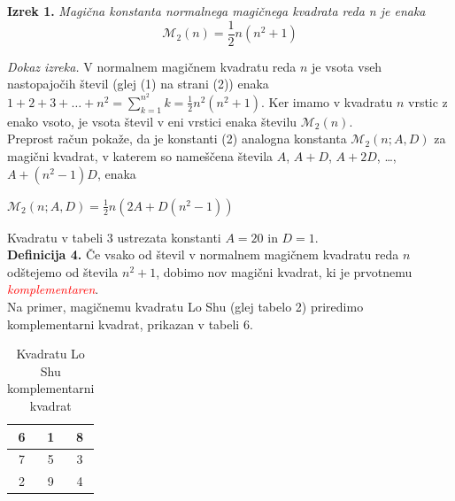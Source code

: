 \documentclass[a4paper,12pt]{article}
\begin{document}
   \textbf{Izrek 1.} \emph{Magična konstanta normalnega magičnega kvadrata reda n
   je enaka}
   \begin{equation}
      \label{eq:mc}
      \mathcal{M}_2(n) = \frac{1}{2} n(n^2+1)
   \end{equation}

   \emph{Dokaz izreka.} V normalnem magičnem kvadratu reda $n$ je vsota vseh nastopajočih
   števil (glej (1) na strani (2)) enaka
   $1+2+3+\dots+n^2=\sum_{k=1}^{n^2}k=\frac{1}{2}n^2(n^2+1)$. Ker imamo
   v kvadratu $n$ vrstic z enako vsoto, je vsota števil v eni vrstici
   enaka številu $\mathcal{M}_2(n)$. %
\\[1em]
Preprost račun pokaže, da je konstanti (2) analogna konstanta
$\mathcal{M}_2(n;A,D)$ za magični kvadrat, v katerem so nameščena števila
$A$, $A+D$, $A+2D$, \dots, $A+(n^2-1)D$, enaka %
\begin{center}
   $\mathcal{M}_2(n;A,D) = \frac{1}{2} n(2A + D(n^2-1))$
\end{center}

Kvadratu v tabeli 3 ustrezata konstanti $A=20$ in $D=1$.
\\[1em]
      \textbf{Definicija 4.} Če vsako od števil v normalnem magičnem kvadratu reda $n$ odštejemo
      od števila $n^2+1$, dobimo nov magični kvadrat, ki je prvotnemu
      \textcolor{red}{\emph{komplementaren}}.
\\[1em]
Na primer, magičnemu kvadratu Lo Shu (glej tabelo 2) priredimo
komplementarni kvadrat, prikazan v tabeli 6.
%
\begin{table}[h]
   \centering
   \caption{Kvadratu Lo Shu komplementarni kvadrat}
   \label{ttable:closhu}
   \begin{tabular}{|c|c|c|}
      \hline
      6 & 1 & 8 \\ \hline
      7 & 5 & 3 \\ \hline
      2 & 9 & 4 \\ \hline
   \end{tabular}
\end{table}
\end{document}
